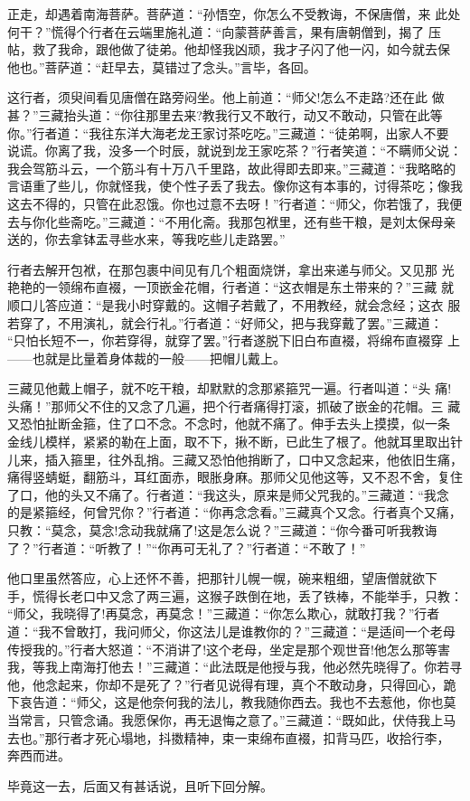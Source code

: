正走，却遇着南海菩萨。菩萨道：“孙悟空，你怎么不受教诲，不保唐僧，来
此处何干？”慌得个行者在云端里施礼道：“向蒙菩萨善言，果有唐朝僧到，揭了
压帖，救了我命，跟他做了徒弟。他却怪我凶顽，我才子闪了他一闪，如今就去保
他也。”菩萨道：“赶早去，莫错过了念头。”言毕，各回。

这行者，须臾间看见唐僧在路旁闷坐。他上前道：“师父!怎么不走路?还在此
做甚？”三藏抬头道：“你往那里去来?教我行又不敢行，动又不敢动，只管在此等
你。”行者道：“我往东洋大海老龙王家讨茶吃吃。”三藏道：“徒弟啊，出家人不要
说谎。你离了我，没多一个时辰，就说到龙王家吃茶？”行者笑道：“不瞒师父说：
我会驾筋斗云，一个筋斗有十万八千里路，故此得即去即来。”三藏道：“我略略的
言语重了些儿，你就怪我，使个性子丢了我去。像你这有本事的，讨得茶吃；像我
这去不得的，只管在此忍饿。你也过意不去呀！”行者道：“师父，你若饿了，我便
去与你化些斋吃。”三藏道：“不用化斋。我那包袱里，还有些干粮，是刘太保母亲
送的，你去拿钵盂寻些水来，等我吃些儿走路罢。”

行者去解开包袱，在那包裹中间见有几个粗面烧饼，拿出来递与师父。又见那
光艳艳的一领绵布直裰，一顶嵌金花帽，行者道：“这衣帽是东土带来的？”三藏
就顺口儿答应道：“是我小时穿戴的。这帽子若戴了，不用教经，就会念经；这衣
服若穿了，不用演礼，就会行礼。”行者道：“好师父，把与我穿戴了罢。”三藏道：
“只怕长短不一，你若穿得，就穿了罢。”行者遂脱下旧白布直裰，将绵布直裰穿
上——也就是比量着身体裁的一般——把帽儿戴上。

三藏见他戴上帽子，就不吃干粮，却默默的念那紧箍咒一遍。行者叫道：“头
痛!头痛！”那师父不住的又念了几遍，把个行者痛得打滚，抓破了嵌金的花帽。三
藏又恐怕扯断金箍，住了口不念。不念时，他就不痛了。伸手去头上摸摸，似一条
金线儿模样，紧紧的勒在上面，取不下，揪不断，已此生了根了。他就耳里取出针
儿来，插入箍里，往外乱捎。三藏又恐怕他捎断了，口中又念起来，他依旧生痛，
痛得竖蜻蜓，翻筋斗，耳红面赤，眼胀身麻。那师父见他这等，又不忍不舍，复住
了口，他的头又不痛了。行者道：“我这头，原来是师父咒我的。”三藏道：“我念
的是紧箍经，何曾咒你？”行者道：“你再念念看。”三藏真个又念。行者真个又痛，
只教：“莫念，莫念!念动我就痛了!这是怎么说？”三藏道：“你今番可听我教诲
了？”行者道：“听教了！”“你再可无礼了？”行者道：“不敢了！”

他口里虽然答应，心上还怀不善，把那针儿幌一幌，碗来粗细，望唐僧就欲下
手，慌得长老口中又念了两三遍，这猴子跌倒在地，丢了铁棒，不能举手，只教：
“师父，我晓得了!再莫念，再莫念！”三藏道：“你怎么欺心，就敢打我？”行者
道：“我不曾敢打，我问师父，你这法儿是谁教你的？”三藏道：“是适间一个老母
传授我的。”行者大怒道：“不消讲了!这个老母，坐定是那个观世音!他怎么那等害
我，等我上南海打他去！”三藏道：“此法既是他授与我，他必然先晓得了。你若寻
他，他念起来，你却不是死了？”行者见说得有理，真个不敢动身，只得回心，跪
下哀告道：“师父，这是他奈何我的法儿，教我随你西去。我也不去惹他，你也莫
当常言，只管念诵。我愿保你，再无退悔之意了。”三藏道：“既如此，伏侍我上马
去也。”那行者才死心塌地，抖擞精神，束一束绵布直裰，扣背马匹，收拾行李，
奔西而进。

毕竟这一去，后面又有甚话说，且听下回分解。